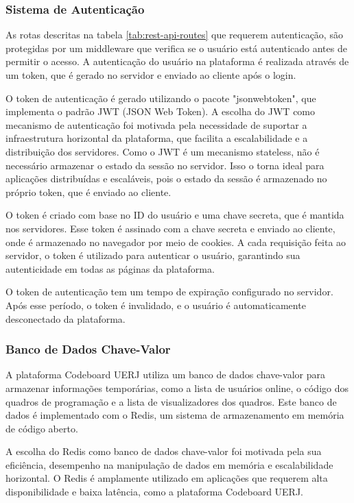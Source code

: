 \subsubsection{Sistema de Autenticação}

As rotas descritas na tabela \ref{tab:rest-api-routes} que requerem autenticação, são protegidas por um middleware que verifica se o usuário está autenticado antes de permitir o acesso. A autenticação do usuário na plataforma é realizada através de um token, que é gerado no servidor e enviado ao cliente após o login. 

O token de autenticação é gerado utilizando o pacote "jsonwebtoken", que implementa o padrão JWT (JSON Web Token). A escolha do JWT como mecanismo de autenticação foi motivada pela necessidade de suportar a infraestrutura horizontal da plataforma, que facilita a escalabilidade e a distribuição dos servidores. Como o JWT é um mecanismo stateless, não é necessário armazenar o estado da sessão no servidor. Isso o torna ideal para aplicações distribuídas e escaláveis, pois o estado da sessão é armazenado no próprio token, que é enviado ao cliente.

O token é criado com base no ID do usuário e uma chave secreta, que é mantida nos servidores. Esse token é assinado com a chave secreta e enviado ao cliente, onde é armazenado no navegador por meio de cookies. A cada requisição feita ao servidor, o token é utilizado para autenticar o usuário, garantindo sua autenticidade em todas as páginas da plataforma.

O token de autenticação tem um tempo de expiração configurado no servidor. Após esse período, o token é invalidado, e o usuário é automaticamente desconectado da plataforma.

\subsubsection{Banco de Dados Chave-Valor}

A plataforma Codeboard UERJ utiliza um banco de dados chave-valor para armazenar informações temporárias, como a lista de usuários online, o código dos quadros de programação e a lista de visualizadores dos quadros. Este banco de dados é implementado com o Redis, um sistema de armazenamento em memória de código aberto.

A escolha do Redis como banco de dados chave-valor foi motivada pela sua eficiência, desempenho na manipulação de dados em memória e escalabilidade horizontal. O Redis é amplamente utilizado em aplicações que requerem alta disponibilidade e baixa latência, como a plataforma Codeboard UERJ.


